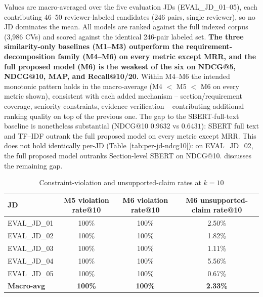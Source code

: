 \documentclass[12pt,a4paper,oneside]{report}
\begin{document}
Values are macro-averaged over the five evaluation JDs (EVAL\_JD\_01--05), each contributing 46--50 reviewer-labeled candidates (246 pairs, single reviewer), so no JD dominates the mean. All models are ranked against the full indexed corpus (3,986 CVs) and scored against the identical 246-pair labeled set. \textbf{The three similarity-only baselines (M1--M3) outperform the requirement-decomposition family (M4--M6) on every metric except MRR, and the full proposed model (M6) is the weakest of the six on NDCG@5, NDCG@10, MAP, and Recall@10/20.} Within M4--M6 the intended monotonic pattern holds in the macro-average (M4 $<$ M5 $<$ M6 on every metric shown), consistent with each added mechanism -- section/requirement coverage, seniority constraints, evidence verification -- contributing additional ranking quality on top of the previous one. The gap to the SBERT-full-text baseline is nonetheless substantial (NDCG@10 $0.9632$ vs $0.6431$): SBERT full text and TF--IDF outrank the full proposed model on every metric except MRR. This does not hold identically per-JD (Table~\ref{tab:per-jd-ndcg10}): on EVAL\_JD\_02, the full proposed model outranks Section-level SBERT on NDCG@10.  discusses the remaining gap.

\begin{table}[htbp]
\centering
\caption{Constraint-violation and unsupported-claim rates at $k{=}10$}
\label{tab:violation-rates}
\begin{tabular}{lccc}
\toprule
JD & M5 violation rate@10 & M6 violation rate@10 & M6 unsupported-claim rate@10 \\
\midrule
EVAL\_JD\_01 & 100\% & 100\% & 2.50\% \\
EVAL\_JD\_02 & 100\% & 100\% & 1.82\% \\
EVAL\_JD\_03 & 100\% & 100\% & 1.11\% \\
EVAL\_JD\_04 & 100\% & 100\% & 5.56\% \\
EVAL\_JD\_05 & 100\% & 100\% & 0.67\% \\
\textbf{Macro-avg} & \textbf{100\%} & \textbf{100\%} & \textbf{2.33\%} \\
\bottomrule
\end{tabular}
\end{table}
\end{document}
